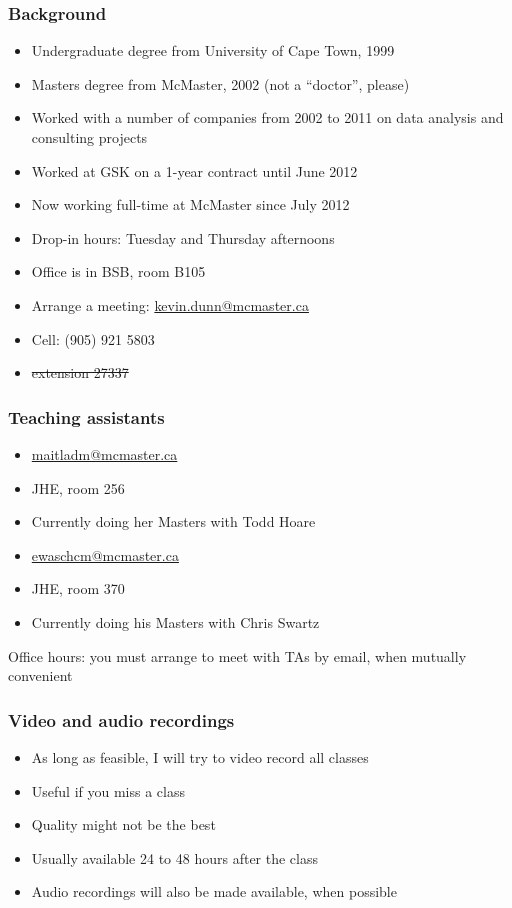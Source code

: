 \begin{frame}\frametitle{Background}
	{\color{myGreen}{About myself}}
	\begin{itemize}
		\item	Undergraduate degree from University of Cape Town, 1999
		\item	Masters degree from McMaster, 2002 (not a ``doctor'', please)
		\item	Worked with a number of companies from 2002 to 2011 on data analysis and consulting projects
		\item	Worked at GSK on a 1-year contract until June 2012		
		\item	Now working full-time at McMaster since July 2012
		\item	Drop-in hours: Tuesday and Thursday afternoons
		\item	Office is in BSB, room B105
		\item	Arrange a meeting: \url{kevin.dunn@mcmaster.ca}
		\item	Cell: (905) 921 5803
		\item	\sout{extension 27337}
	\end{itemize}	
\end{frame}

\begin{frame}\frametitle{Teaching assistants}
	{\color{myGreen}{Danielle Maitland}}
	\begin{itemize}
		\item	\url{maitladm@mcmaster.ca}
		\item	JHE, room 256
		\item	Currently doing her Masters with Todd Hoare
	\end{itemize}
	\vspace{12pt}
	{\color{myGreen}{Chris Ewaschuk}}
	\begin{itemize}
		\item	\url{ewaschcm@mcmaster.ca}
		\item	JHE, room 370
		\item	Currently doing his Masters with Chris Swartz
	\end{itemize}
	\vspace{12pt}
	Office hours: you must arrange to meet with TAs by email, when mutually convenient
\end{frame}

\begin{frame}\frametitle{Video and audio recordings}
	\begin{itemize}
		\item	As long as feasible, I will try to video record all classes
		\item	Useful if you miss a class
		\item	Quality might not be the best
		\item	Usually available 24 to 48 hours after the class
		\item	Audio recordings will also be made available, when possible
	\end{itemize}
\end{frame}

